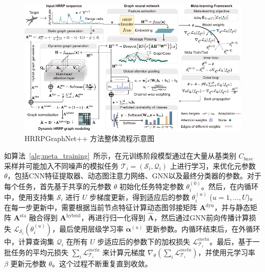 \begin{figure}[h]
    \centering
    \includegraphics[width=\linewidth]{figures/method1.pdf} %
    \caption{HRRPGraphNet++ 方法整体流程示意图}
    \label{fig:dataset_chap3}
\end{figure}

如算法~\ref{alg:meta_training}~所示，在元训练阶段模型通过在大量从基类别 $C_{base}$ 采样并可能加入不同噪声的模拟任务 $\mathcal{T}_i=(\mathcal{S}_i, \mathcal{Q}_i)$ 上进行学习，来优化元参数 $\theta$，包括CNN特征提取器、动态图注意力网络、GNN以及最终分类器的参数。对于每个任务，首先基于共享的元参数 $\theta$ 初始化任务特定参数 $\theta_i^{(0)}$。然后，在内循环中，使用支持集 $\mathcal{S}_i$ 进行 $U$ 步梯度更新，得到适应后的参数 $\theta_i^{(u)}$ ($u=1, \dots, U$)。在每一步更新中，需要根据当前节点特征计算动态图邻接矩阵 $\mathbf{A}^{\text{dyn}}$，并与静态矩阵 $\mathbf{A}^{\text{sta}}$ 融合得到 $\mathbf{A}^{\text{hybrid}}$，再进行归一化得到 $\hat{\mathbf{A}}$，然后通过GNN前向传播计算损失 $\mathcal{L}_{\mathcal{S}_i}(\theta_i^{(u)})$，最后使用层级学习率 $\boldsymbol{\alpha}^{(u)}$ 更新参数。内循环结束后，在外循环中，计算查询集 $\mathcal{Q}_i$ 在所有 $U$ 步适应后的参数下的加权损失 $\mathcal{L}_{\mathcal{T}_i}^{meta}$。最后，基于一批任务的平均元损失 $\sum_i \mathcal{L}_{\mathcal{T}_i}^{meta}$ 来计算元梯度 $\nabla_\theta (\sum_i \mathcal{L}_{\mathcal{T}_i}^{meta})$，并使用元学习率 $\beta$ 更新元参数 $\theta$。这个过程不断重复直到收敛。

